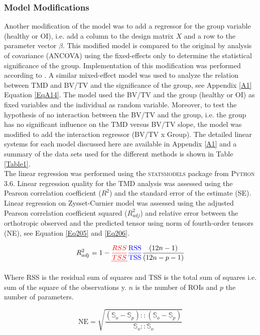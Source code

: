 \documentclass[a4paper,fleqn]{DC_ArtStyle}
\providecommand{\DIFadd}[1]{{\protect\color{blue}{#1}}} %
\providecommand{\DIFdel}[1]{{\protect\color{red}\sout{#1}}}                      %
\providecommand{\DIFaddbegin}{} %
\providecommand{\DIFaddend}{} %
\providecommand{\DIFdelbegin}{} %
\providecommand{\DIFdelend}{} %
\begin{document}
\subsubsection{Model Modifications}
Another modification of the model was to add a regressor for the group variable (healthy or OI), i.e. add a column to the design matrix $X$ and a row to the parameter vector $\beta$. This modified model is compared to the original by analysis of covariance (ANCOVA) using the fixed-effects only to determine the statistical significance of the group. Implementation of this modification was performed according to \cite{Fox2016}. A similar mixed-effect model was used to analyze the relation between TMD and BV/TV and the significance of the group, see Appendix \ref{A1} Equation \ref{EqA14}. The model used the BV/TV and the group (healthy or OI) as fixed variables and the individual as random variable. Moreover, to test the hypothesis of no interaction between the BV/TV and the group, i.e. the group has no significant influence on the TMD versus BV/TV slope, the model was modified to add the interaction regressor (BV/TV x Group). The detailed linear systems for each model discussed here are available in Appendix \ref{A1} and a summary of the data sets used for the different methods is shown in Table \ref{Table1}.\\

The linear regression was performed using the \textsc{statsmodels} package from \textsc{Python 3.6}. Linear regression quality for the TMD analysis was assessed using the Pearson correlation coefficient ($R^2$) and the standard error of the estimate (SE). Linear regression on Zysset-Curnier model was assessed using the adjusted Pearson correlation coefficient squared ($R^2_{adj}$) and relative error between the orthotropic observed and the predicted tensor using norm of fourth-order tensors (NE), see Equation \ref{Eq205} and \ref{Eq206}. 

\begin{equation}
	R^2_{adj} = 1 - \DIFdelbegin \DIFdel{\frac{RSS}{TSS} }\DIFdelend \DIFaddbegin \DIFadd{\frac{\mathrm{RSS}}{\mathrm{TSS}} }\DIFaddend \frac{(12n-1)}{(12n - p - 1)}
	\label{Eq205}
\end{equation}

Where RSS is the residual sum of squares and TSS is the total sum of squares i.e. sum of the square of the observations y. $n$ is the number of ROIs and $p$ the number of parameters.

\begin{equation}
	\text{NE} = \sqrt{\frac{(\mathbb{S}_o - \mathbb{S}_p) :: (\mathbb{S}_o - \mathbb{S}_p)}{\mathbb{S}_o :: \mathbb{S}_o}}
	\label{Eq206}
\end{equation}
\end{document}
